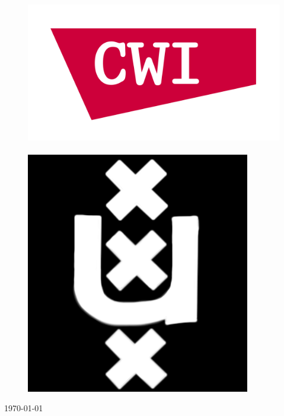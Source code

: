 \documentclass[11pt, a4paper, oneside]{Thesis} %
\begin{document}
\begin{titlepage}
\begin{center}
\begin{figure}[b]
\centering
\includegraphics[scale=0.8]{cwi-logo.png}
$\;$ $\;$ $\;$ $\;$ $\;$ $\;$ $\;$ $\;$ $\;$
$\;$ $\;$ $\;$ 
$\;$ $\;$ $\;$ $\;$ $\;$ $\;$ $\;$ $\;$ $\;$ 
\includegraphics[scale=0.2]{uva-logo.png}
\vspace{2pt}
\end{figure}
{\large \today}\\[4cm] 
\vfill
\end{center}

\end{titlepage}

\end{document}
